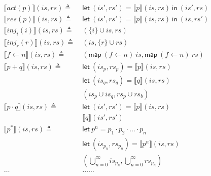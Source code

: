 \documentclass[12pt, letterpaper]{article}
\newcommand\interp[1]{\llbracket #1 \rrbracket}
\begin{document}
\begin{align*}
        \interp { act(p) }(\mathit{is}, \mathit{rs})
            \triangleq\ &
            \mathsf{let}\ (\mathit{is}',\mathit{rs}')
            = \interp { p}(\mathit{is}, \mathit{rs})\ 
            \mathsf{in}\ (\mathit{is}',\mathit{rs}) 
            \\
        \interp { res(p) }(\mathit{is}, \mathit{rs})
            \triangleq\ &
            \mathsf{let}\ (\mathit{is}',\mathit{rs}')
            = \interp { p}(\mathit{is}, \mathit{rs})\ 
            \mathsf{in}\ (\mathit{is},\mathit{rs}')
            \\
        \interp { inj_{i}(i) }(\mathit{is}, \mathit{rs})
            \triangleq\ &
            (\{i\} \cup \mathit{is}, \mathit{rs})
            \\
        \interp { inj_{r}(r) }(\mathit{is}, \mathit{rs})
            \triangleq\ &
            (\mathit{is}, \{r\} \cup \mathit{rs})
            \\
        \interp { f \leftarrow n }(\mathit{is}, \mathit{rs})
            \triangleq\ &
            (\mathsf{map}\ (f\leftarrow n)\ \mathit{is},
             \mathsf{map}\ (f\leftarrow n)\ \mathit{rs})
            \\
         \interp { p + q }(\mathit{is}, \mathit{rs})
            \triangleq\ &
            \mathsf{let}\ (\mathit{is}_p,\mathit{rs}_p) =
            \interp { p }(\mathit{is}, \mathit{rs}) 
            \\
            &\mathsf{let}\ (\mathit{is}_q,\mathit{rs}_q) =
            \interp { q }(\mathit{is}, \mathit{rs}) 
            \\
            &(\mathit{is}_p \cup \mathit{is}_q,\mathit{rs}_p \cup \mathit{rs}_b) 
            \\
        \interp { p \cdot q }(\mathit{is}, \mathit{rs})
            \triangleq\ &
            \mathsf{let}\ (\mathit{is}',\mathit{rs}') =
            \interp { p }(\mathit{is}, \mathit{rs})
            \\
            &\interp { q }(\mathit{is}', \mathit{rs}')
            \\
        \interp { p ^{*} } (\mathit{is}, \mathit{rs})
            \triangleq\ &
            \mathsf{let}\ p^{n} = p_{1} \cdot p_{2} \cdot \ldots \cdot p_{n}
            \\
            &\mathsf{let}\ (\mathit{is_{p_{n}}}, \mathit{rs_{p_{n}}}) = \interp { p^{n} } (is, rs)
            \\
            &(\bigcup^{\infty}_{n=0} \mathit{is_{p_{n}}}, \bigcup^{\infty}_{n=0} \mathit{rs_{p_{n}}})
            \\  
        \dots & \dots \dots \\
    \end{align*}
\end{document}
